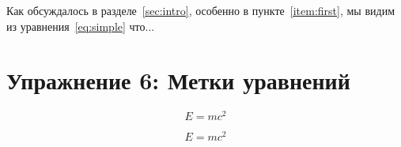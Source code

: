 \documentclass{article}
\begin{document}
Как обсуждалось в разделе~\ref{sec:intro}, особенно в пункте~\ref{item:first}, мы видим из уравнения~\ref{eq:simple} что...


\section*{Упражнение 6: Метки уравнений}

\begin{equation}
E = mc^2
\label{eq:energy}
\end{equation}

\begin{equation}
E = mc^2
\end{equation}
\label{eq:energy}
\end{document}
